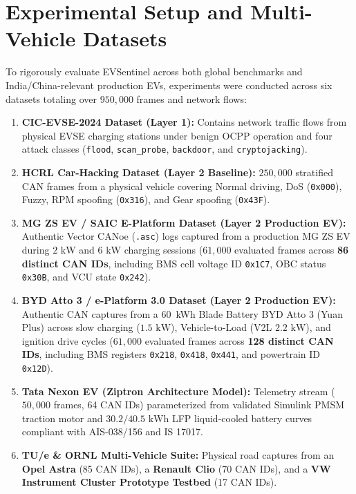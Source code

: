 \documentclass[conference]{IEEEtran}
\begin{document}
\section{Experimental Setup and Multi-Vehicle Datasets}
To rigorously evaluate EVSentinel across both global benchmarks and India/China-relevant production EVs, experiments were conducted across six datasets totaling over $950,000$ frames and network flows:
\begin{enumerate}
    \item \textbf{CIC-EVSE-2024 Dataset (Layer 1):} Contains network traffic flows from physical EVSE charging stations under benign OCPP operation and four attack classes (\texttt{flood}, \texttt{scan\_probe}, \texttt{backdoor}, and \texttt{cryptojacking}).
    \item \textbf{HCRL Car-Hacking Dataset (Layer 2 Baseline):} $250,000$ stratified CAN frames from a physical vehicle covering Normal driving, DoS (\texttt{0x000}), Fuzzy, RPM spoofing (\texttt{0x316}), and Gear spoofing (\texttt{0x43F}).
    \item \textbf{MG ZS EV / SAIC E-Platform Dataset (Layer 2 Production EV):} Authentic Vector CANoe (\texttt{.asc}) logs captured from a production MG ZS EV during $2\text{ kW}$ and $6\text{ kW}$ charging sessions ($61,000$ evaluated frames across \textbf{86 distinct CAN IDs}, including BMS cell voltage ID \texttt{0x1C7}, OBC status \texttt{0x30B}, and VCU state \texttt{0x242}).
    \item \textbf{BYD Atto 3 / e-Platform 3.0 Dataset (Layer 2 Production EV):} Authentic CAN captures from a 60~kWh Blade Battery BYD Atto 3 (Yuan Plus) across slow charging ($1.5\text{ kW}$), Vehicle-to-Load (V2L $2.2\text{ kW}$), and ignition drive cycles ($61,000$ evaluated frames across \textbf{128 distinct CAN IDs}, including BMS registers \texttt{0x218}, \texttt{0x418}, \texttt{0x441}, and powertrain ID \texttt{0x12D}).
    \item \textbf{Tata Nexon EV (Ziptron Architecture Model):} Telemetry stream ($50,000$ frames, 64 CAN IDs) parameterized from validated Simulink PMSM traction motor and $30.2/40.5\text{ kWh}$ LFP liquid-cooled battery curves \cite{jadhav2023} compliant with AIS-038/156 and IS 17017.
    \item \textbf{TU/e \& ORNL Multi-Vehicle Suite:} Physical road captures from an \textbf{Opel Astra} (85 CAN IDs), a \textbf{Renault Clio} (70 CAN IDs), and a \textbf{VW Instrument Cluster Prototype Testbed} (17 CAN IDs).
\end{enumerate}
\end{document}
